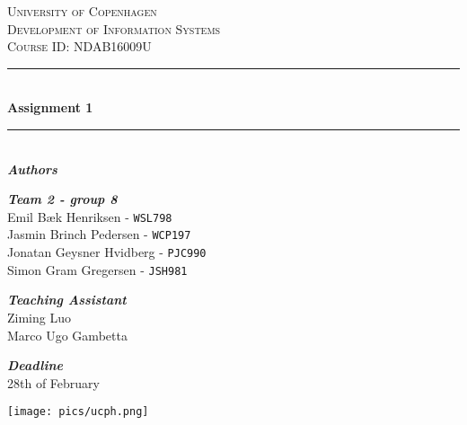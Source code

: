 \documentclass[a4paper,11pt]{article}
\begin{document}
\begin{titlepage}
    \newcommand{\HRule}{\rule{\linewidth}{0.5mm}}
    \center
    \textsc{\LARGE University of Copenhagen}\\[1.5cm]
    \textsc{\Large Development of Information Systems}\\[0.5cm]
    \textsc{Course ID: NDAB16009U}

    \vfill
    \HRule\\[0.4cm]
    {\huge\bfseries Assignment 1}\\[0.4cm]
    \HRule\\[1.5cm]

    \large\textit{\textbf{Authors}}
    
    \large\textit{\textbf{Team 2 -  group 8}}
    \\Emil Bæk Henriksen - \texttt{WSL798}
    \\Jasmin Brinch Pedersen - \texttt{WCP197}
    \\Jonatan Geysner Hvidberg - \texttt{PJC990}
    \\Simon Gram Gregersen - \texttt{JSH981}
    
    \vfill

    \large\textit{\textbf{Teaching Assistant}}
    \\Ziming Luo
    \\Marco Ugo Gambetta

    \vfill
    \large\textit{\textbf{Deadline}}
    \\28th of February
    \vfill

\texttt{[image: pics/ucph.png]}
\end{titlepage}


\newpage
\tableofcontents
\newpage

\end{document}
